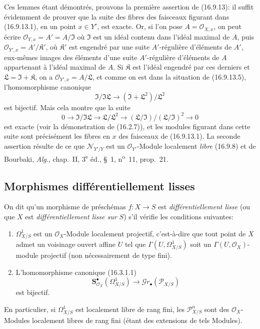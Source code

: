 Ces lemmes étant démontrés, prouvons la première assertion de (16.9.13): il
suffit
évidemment de prouver que la suite des fibres des faisceaux figurant dans
(16.9.13.1), en un point $x\in Y'$, est exacte. Or, si l'on pose
$A=\mathcal{O}_{X,x}$, on peut écrire
$\mathcal{O}_{Y,x}=A'=A/\mathfrak{I}$ où $\mathfrak{I}$ est un idéal contenu
dans l'idéal maximal de $A$, puis
$\mathcal{O}_{Y',x}=A'/\mathfrak{K}'$, où $\mathfrak{K}'$ est engendré par une
suite $A'$-régulière d'éléments de $A'$, eux-mêmes images des éléments d'une
suite $A'$-régulière d'éléments de $A$ appartenant à l'idéal maximal de $A$.
Si $\mathfrak{K}$ est l'idéal engendré par ces derniers et
$\mathfrak{L}=\mathfrak{I}+\mathfrak{K}$, on a
$\mathcal{O}_{Y',x}=A/\mathfrak{L}$, et comme on est dans la situation de
(16.9.13.5), l'homomorphisme canonique
\[
  \mathfrak{I}/\mathfrak{I}\mathfrak{L}
  \longrightarrow(\mathfrak{I}+\mathfrak{L}^2)/\mathfrak{L}^2
\]
est bijectif. Mais cela montre que la suite
\[
  0\longrightarrow\mathfrak{I}/\mathfrak{I}\mathfrak{L}
  \longrightarrow\mathfrak{L}/\mathfrak{L}^2
  \longrightarrow(\mathfrak{L}/\mathfrak{I})/
    (\mathfrak{L}/\mathfrak{I})^2\longrightarrow0
\]
est exacte (voir la démonstration de (16.2.7)), et les modules figurant dans
cette suite sont précisément les fibres en $x$ des faisceaux de (16.9.13.1).
La seconde assertion résulte de ce que $\mathcal{N}_{Y'/Y}$ est un
$\mathcal{O}_{Y'}$-Module localement \emph{libre} (16.9.8) et de Bourbaki,
\emph{Alg.}, chap.~II, 3\textsuperscript{e} éd., §~1, n\textsuperscript{o}~11,
prop.~21.

\subsection{Morphismes différentiellement lisses}

\begin{definition}[16.10.1]
On dit qu'un morphisme de préschémas $f:X\to S$ est
\emph{différentiellement lisse} (ou que $X$ est \emph{différentiellement
lisse sur $S$}) s'il vérifie les conditions suivantes:
\begin{enumerate}
  \item[(i)] $\Omega_{X/S}^1$ est un $\mathcal{O}_X$-Module localement
  projectif, c'est-à-dire que tout point de $X$ admet un voisinage ouvert
  affine $U$ tel que $\Gamma(U,\Omega_{X/S}^1)$ soit un
  $\Gamma(U,\mathcal{O}_X)$-module projectif (non nécessairement de type
  fini).
  \item[(ii)] L'homomorphisme canonique (16.3.1.1)
  \[
    \mathbf{S}_{\mathcal{O}_X}^{\bullet}(\Omega_{X/S}^1)
    \longrightarrow\mathscr{G}r_{\bullet}(\mathscr{P}_{X/S})
  \]
  est bijectif.
\end{enumerate}
En particulier, si $\Omega_{X/S}^1$ est localement libre de rang fini, les
$\mathscr{P}_{X/S}^n$ sont des $\mathcal{O}_X$-Modules localement libres de
rang fini (étant des extensions de tels Modules).
\end{definition}

